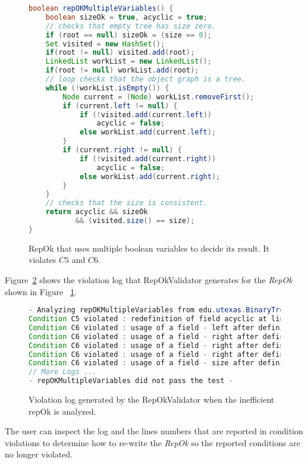 \begin{figure}
\centering
\begin{lstlisting}[language=Java]
boolean repOKMultipleVariables() {
    boolean sizeOk = true, acyclic = true;
    // checks that empty tree has size zero.
    if (root == null) sizeOk = (size == 0);
    Set visited = new HashSet();
    if(root != null) visited.add(root);
    LinkedList workList = new LinkedList();
    if(root != null) workList.add(root);
    // loop checks that the object graph is a tree.
    while (!workList.isEmpty()) {
        Node current = (Node) workList.removeFirst();
        if (current.left != null) {
            if (!visited.add(current.left)) 
                acyclic = false;
            else workList.add(current.left);
        }
        if (current.right != null) {
            if (!visited.add(current.right)) 
                acyclic = false;
            else workList.add(current.right);
        }
    }
    // checks that the size is consistent.
    return acyclic && sizeOk 
           && (visited.size() == size);  
}
\end{lstlisting}
\caption{RepOk that uses multiple boolean variables to decide its result. It violates $C5$ and $C6$.}
\label{fig:repOkMultipleBooleanVariables}
\end{figure}


\para Figure~\ref{fig:repOkKoratSatisfyEfficiencyLog} shows the
violation log that RepOkValidator generates for the \emph{RepOk} shown
in Figure~ \ref{fig:repOkMultipleBooleanVariables}.

\begin{figure}
\centering
\begin{lstlisting}[language=Java]
- Analyzing repOKMultipleVariables from edu.utexas.BinaryTree -
Condition C5 violated : redefinition of field acyclic at line 91 inside repOKMultipleVariables in edu.utexas.BinaryTree.java
Condition C6 violated : usage of a field - left after defining return value from class edu.utexas.BinaryTree$Node at line 87 inside repOKMultipleVariables in edu.utexas.BinaryTree.java
Condition C6 violated : usage of a field - right after defining return value from class edu.utexas.BinaryTree$Node at line 89 inside repOKMultipleVariables in edu.utexas.BinaryTree.java
Condition C6 violated : usage of a field - right after defining return value from class edu.utexas.BinaryTree$Node at line 90 inside repOKMultipleVariables in edu.utexas.BinaryTree.java
Condition C6 violated : usage of a field - right after defining return value from class edu.utexas.BinaryTree$Node at line 92 inside repOKMultipleVariables in edu.utexas.BinaryTree.java
Condition C6 violated : usage of a field - size after defining return value from class edu.utexas.BinaryTree at line 96 inside repOKMultipleVariables in edu.utexas.BinaryTree.java
// More Logs ...
- repOKMultipleVariables did not pass the test -
\end{lstlisting}
\caption{Violation log generated by the RepOkValidator when the inefficient repOk is analyzed.}
\label{fig:repOkKoratSatisfyEfficiencyLog}
\end{figure}

The user can inspect the log and the lines numbers that are reported
in condition violations to determine how to re-write the \emph{RepOk} so the
reported conditions are no longer violated.
